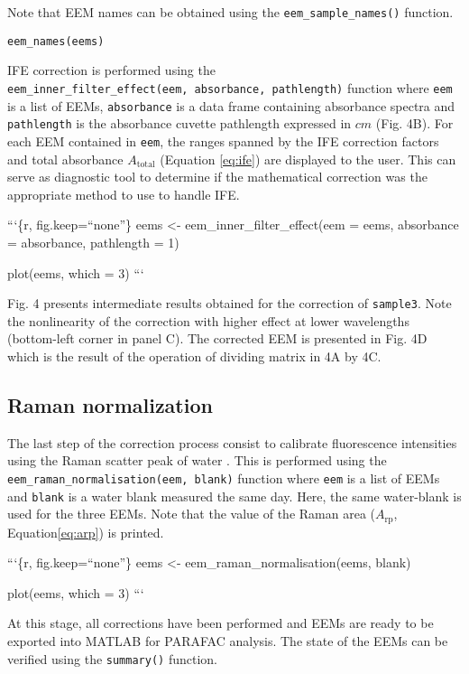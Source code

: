 \documentclass[]{book}
\theoremstyle{definition}
\theoremstyle{definition}
\theoremstyle{remark}
\begin{document}
Note that EEM names can be obtained using the
\texttt{eem\_sample\_names()} function.

\begin{verbatim}
eem_names(eems)
\end{verbatim}

IFE correction is performed using the
\texttt{eem\_inner\_filter\_effect(eem,\ absorbance,\ pathlength)}
function where \texttt{eem} is a list of EEMs, \texttt{absorbance} is a
data frame containing absorbance spectra and \texttt{pathlength} is the
absorbance cuvette pathlength expressed in \(cm\) (Fig. 4B). For each
EEM contained in \texttt{eem}, the ranges spanned by the IFE correction
factors and total absorbance \(A_{\text{total}}\) (Equation
\eqref{eq:ife}) are displayed to the user. This can serve as diagnostic
tool to determine if the mathematical correction was the appropriate
method to use to handle IFE.

```\{r, fig.keep=``none''\} eems \textless{}-
eem\_inner\_filter\_effect(eem = eems, absorbance = absorbance,
pathlength = 1)

plot(eems, which = 3) ```

Fig. 4 presents intermediate results obtained for the correction of
\texttt{sample3}. Note the nonlinearity of the correction with higher
effect at lower wavelengths (bottom-left corner in panel C). The
corrected EEM is presented in Fig. 4D which is the result of the
operation of dividing matrix in 4A by 4C.

\subsection{Raman normalization}\label{raman-normalization}

The last step of the correction process consist to calibrate
fluorescence intensities using the Raman scatter peak of water
\citep{Lawaetz2009}. This is performed using the
\texttt{eem\_raman\_normalisation(eem,\ blank)} function where
\texttt{eem} is a list of EEMs and \texttt{blank} is a water blank
measured the same day. Here, the same water-blank is used for the three
EEMs. Note that the value of the Raman area (\(A_{\text{rp}}\),
Equation\eqref{eq:arp}) is printed.

```\{r, fig.keep=``none''\} eems \textless{}-
eem\_raman\_normalisation(eems, blank)

plot(eems, which = 3) ```

At this stage, all corrections have been performed and EEMs are ready to
be exported into MATLAB for PARAFAC analysis. The state of the EEMs can
be verified using the \texttt{summary()} function.
\end{document}
